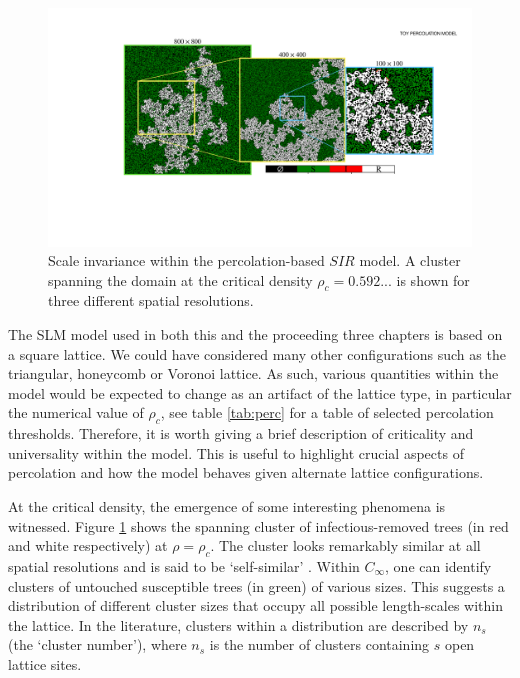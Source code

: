 \begin{figure}
    \centering
    \includegraphics[scale=0.325]{chapter3/figures/figure3.pdf}
    \caption{Scale invariance within the percolation-based $SIR$ model. A cluster spanning the domain at the critical density $\rho_c = 0.592...$ is shown for three different spatial resolutions.}
    \label{fig:ch3-perc-invariance}
\end{figure}

The SLM model used in both this and the proceeding three chapters is based on a square lattice. %
We could have considered many other configurations such as the triangular, honeycomb or Voronoi lattice. %
As such, various quantities within the model would be expected to change as an artifact of the lattice type, %
in particular the numerical value of $\rho_c$, see table \ref{tab:perc} for a table of selected percolation thresholds. %
Therefore, it is worth giving a brief description of criticality and universality within the model. %
This is useful to highlight crucial aspects of percolation and how the model  behaves given alternate lattice configurations. %

At the critical density, the emergence of some interesting phenomena is witnessed. %
Figure \ref{fig:ch3-perc-invariance} shows the spanning cluster of infectious-removed trees (in red and white respectively) at $\rho =\rho_c$. %
The cluster looks remarkably similar at all spatial resolutions and is said to be `self-similar' \citep{Kapitulnik_1983}. %
Within $C_\infty$, one can identify clusters of untouched susceptible trees (in green) of various sizes. %
This suggests a distribution of different cluster sizes that occupy all possible length-scales within the lattice. %
In the literature, clusters within a distribution are described by $n_s$ (the `cluster number'), where $n_s$ is the number of clusters containing $s$ open lattice sites. %

